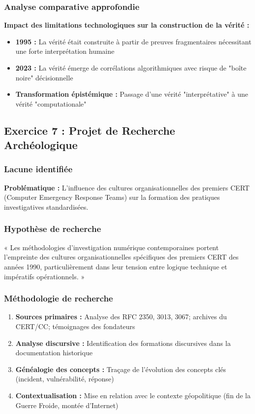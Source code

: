 \documentclass[12pt,a4paper]{article}
\begin{document}
\subsubsection{Analyse comparative approfondie}

\textbf{Impact des limitations technologiques sur la construction de la vérité :}

\begin{itemize}
\item \textbf{1995 :} La vérité était construite à partir de preuves fragmentaires nécessitant une forte interprétation humaine
\item \textbf{2023 :} La vérité émerge de corrélations algorithmiques avec risque de "boîte noire" décisionnelle
\item \textbf{Transformation épistémique :} Passage d'une vérité "interprétative" à une vérité "computationale"
\end{itemize}

\subsection{Exercice 7 : Projet de Recherche Archéologique}

\subsubsection{Lacune identifiée}

\textbf{Problématique :} L'influence des cultures organisationnelles des premiers CERT (Computer Emergency Response Teams) sur la formation des pratiques investigatives standardisées.

\subsubsection{Hypothèse de recherche}

« Les méthodologies d'investigation numérique contemporaines portent l'empreinte des cultures organisationnelles spécifiques des premiers CERT des années 1990, particulièrement dans leur tension entre logique technique et impératifs opérationnels. »

\subsubsection{Méthodologie de recherche}

\begin{enumerate}
\item \textbf{Sources primaires :} Analyse des RFC 2350, 3013, 3067; archives du CERT/CC; témoignages des fondateurs
\item \textbf{Analyse discursive :} Identification des formations discursives dans la documentation historique
\item \textbf{Généalogie des concepts :} Traçage de l'évolution des concepts clés (incident, vulnérabilité, réponse)
\item \textbf{Contextualisation :} Mise en relation avec le contexte géopolitique (fin de la Guerre Froide, montée d'Internet)
\end{enumerate}
\end{document}
